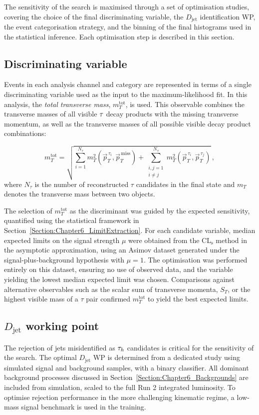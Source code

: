 The sensitivity of the search is maximised through a set of optimisation studies, covering the choice of the final discriminating variable, the $D_{\text{jet}}$ identification WP, the event categorisation strategy, and the binning of the final histograms used in the statistical inference. Each optimisation step is described in this section.

\subsection{Discriminating variable}
Events in each analysis channel and category are represented in terms of a single discriminating variable used as the input to the maximum-likelihood fit. In this analysis, the \textit{total transverse mass}, $m_T^\mathrm{tot}$, is used. This observable combines the transverse masses of all visible $\tau$ decay products with the missing transverse momentum, as well as the transverse masses of all possible visible decay product combinations:

\begin{equation}
m_T^\mathrm{tot} =
\sqrt{ \sum_{i=1}^{N_\tau} m_T^2(\vec{p}_{T}^{\,\tau_i}, \vec{p}_T^{\,\text{miss}}) 
+ \sum_{\substack{i,j=1 \\ i\neq j}}^{N_\tau} m_T^2(\vec{p}_T^{\,\tau_i}, \vec{p}_T^{\,\tau_j}) } \, ,
\end{equation}
where $N_\tau$ is the number of reconstructed $\tau$ candidates in the final state and $m_T$ denotes the transverse mass between two objects.  

The selection of $m_T^\mathrm{tot}$ as the discriminant was guided by the expected sensitivity, quantified using the statistical framework in Section~\ref{Section:Chapter6_LimitExtraction}. For each candidate variable, median expected limits on the signal strength $\mu$ were obtained from the CL$_\mathrm{s}$ method in the asymptotic approximation, using an Asimov dataset generated under the signal‑plus‑background hypothesis with $\mu = 1$. The optimisation was performed entirely on this dataset, ensuring no use of observed data, and the variable yielding the lowest median expected limit was chosen. Comparisons against alternative observables such as the scalar sum of transverse momenta, $S_T$, or the highest visible mass of a $\tau$ pair confirmed $m_T^\mathrm{tot}$ to yield the best expected limits.

\subsection{\texorpdfstring{$D_{\text{jet}}$}{Djet} working point}
The rejection of jets misidentified as $\tau_h$ candidates is critical for the sensitivity of the search. The optimal $D_{\text{jet}}$ WP is determined from a dedicated study using simulated signal and background samples, with a binary classifier. All dominant background processes discussed in Section~\ref{Section:Chapter6_Backgrounds} are included from simulation, scaled to the full Run 2 integrated luminosity. To optimise rejection performance in the more challenging kinematic regime, a low-mass signal benchmark is used in the training.  

